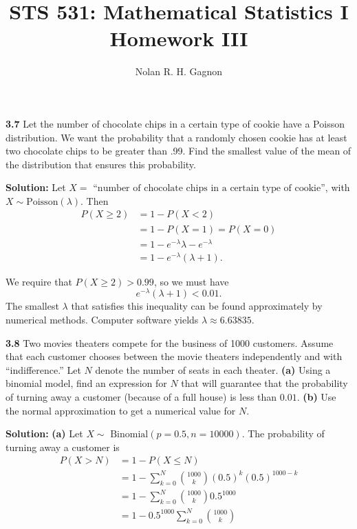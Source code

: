 \documentclass{article}
\title{STS 531:  Mathematical Statistics I \\
	   \textbf{Homework III}}
\author{Nolan R. H. Gagnon}
\newcommand{\mybox}{%
    \collectbox{%
        \setlength{\fboxsep}{1pt}%
        \fbox{\BOXCONTENT}%
    }%
}
\begin{document}
\maketitle
\large
\noindent\mybox{\textbf{3.7}}  Let the number of chocolate chips in a certain type of cookie have a Poisson distribution.  We want the probability that a randomly chosen cookie has at least two chocolate chips to be greater than .99.  Find the smallest value of the mean of the distribution that ensures this probability.

\vspace{3mm}

\noindent\mybox{\textbf{Solution:}}  Let $X = \text{ ``number of chocolate chips in a certain type of cookie''}$, with $X \sim \text{Poisson}(\lambda)$.  Then 
\begin{align}
P(X\geq 2) &= 1 - P(X < 2) \\
&= 1 - P(X=1) = P(X=0) \\
&= 1 - e^{-\lambda}\lambda - e^{-\lambda} \\
&= 1 - e^{-\lambda}(\lambda + 1).
\end{align}

\noindent We require that $P(X\geq 2) > 0.99$, so we must have $$e^{-\lambda}(\lambda + 1) < 0.01.$$  The smallest $\lambda$ that satisfies this inequality can be found approximately by numerical methods.  Computer software yields $\lambda \approx 6.63835$.  

\pagebreak

\noindent\mybox{\textbf{3.8}}  Two movies theaters compete for the business of 1000 customers.  Assume that each customer chooses between the movie theaters independently and with ``indifference.''  Let $N$ denote the number of seats in each theater.  \textbf{(a)}  Using a binomial model, find an expression for $N$ that will guarantee that the probability of turning away a customer (because of a full house) is less than $0.01$.  \textbf{(b)}  Use the normal approximation to get a numerical value for $N$.  

\vspace{3mm}

\noindent\mybox{\textbf{Solution:}}  \textbf{(a)} Let $X \sim \text{ Binomial}(p = 0.5, n = 10000)$.  The probability of turning away a customer is 
\begin{align}
P(X > N) &= 1 - P(X\leq N) \\
&= 1 - \sum\limits_{k = 0}^{N}{1000 \choose k}(0.5)^k(0.5)^{1000 - k} \\
&= 1 - \sum\limits_{k = 0}^N{1000 \choose k}0.5^{1000} \\
&= 1 - 0.5^{1000}\sum\limits_{k = 0}^{N}{1000 \choose k}
\end{align}
\end{document}

